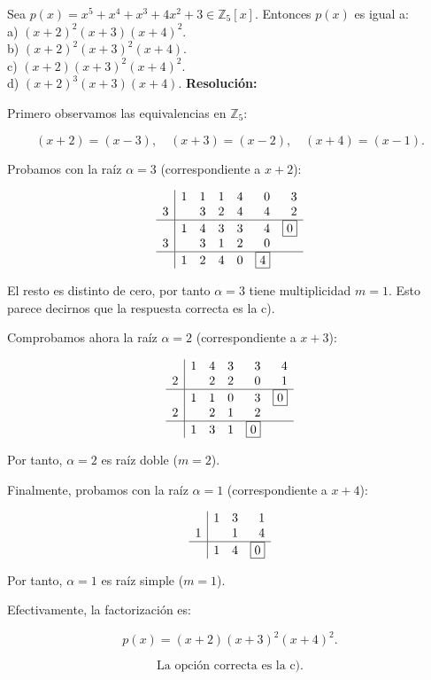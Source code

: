 \documentclass[a4paper,12pt]{article}
\begin{document}
\begin{ejercicio}[title=Ejercicio 47]
Sea $p(x) = x^5 + x^4 + x^3 + 4x^2 + 3 \in \mathbb{Z}_5[x]$.  
Entonces $p(x)$ es igual a: \\

a) $(x + 2)^2 (x + 3)(x + 4)^2$.  \\
b) $(x + 2)^2 (x + 3)^2 (x + 4)$.  \\
c) $(x + 2)(x + 3)^2 (x + 4)^2$.  \\
d) $(x + 2)^3 (x + 3)(x + 4)$.
\tcblower
\textbf{Resolución:}

Primero observamos las equivalencias en $\mathbb{Z}_5$:

\[
(x + 2) = (x - 3), \quad (x + 3) = (x - 2), \quad (x + 4) = (x - 1).
\]

\vspace{0.5em}
Probamos con la raíz $\alpha = 3$ (correspondiente a $x + 2$):

\[
\begin{array}{r|rrrrrr}
  & 1 & 1 & 1 & 4 & 0 & 3 \\
3 &   & 3 & 2 & 4 & 4 & 2 \\
\hline
  & 1 & 4 & 3 & 3 & 4 & \boxed{0} \\
3 &   & 3 & 1 & 2 & 0 \\
\hline
  & 1 & 2 & 4 & 0 & \boxed{4}
\end{array}
\]

El resto es distinto de cero, por tanto \(\alpha = 3\) tiene multiplicidad \(m = 1\). Esto parece decirnos que la respuesta correcta es la c).

\vspace{0.5em}
Comprobamos ahora la raíz \(\alpha = 2\) (correspondiente a \(x + 3\)):

\[
\begin{array}{r|rrrrr}
  & 1 & 4 & 3 & 3 & 4 \\
2 &   & 2 & 2 & 0 & 1 \\
\hline
  & 1 & 1 & 0 & 3 & \boxed{0} \\
2 &   & 2 & 1 & 2 \\
\hline
  & 1 & 3 & 1 & \boxed{0}
\end{array}
\]

Por tanto, \(\alpha = 2\) es raíz doble (\(m = 2\)).

\vspace{0.5em}
Finalmente, probamos con la raíz \(\alpha = 1\) (correspondiente a \(x + 4\)):

\[
\begin{array}{r|rrr}
  & 1 & 3 & 1 \\
1 &   & 1 & 4 \\
\hline
  & 1 & 4 & \boxed{0}
\end{array}
\]

Por tanto, \(\alpha = 1\) es raíz simple (\(m = 1\)).

\vspace{0.5em}
Efectivamente, la factorización es:

\[
p(x) = (x + 2)(x + 3)^2(x + 4)^2.
\]

\[
\boxed{\text{La opción correcta es la  c).}}
\]
\end{ejercicio}
\end{document}
